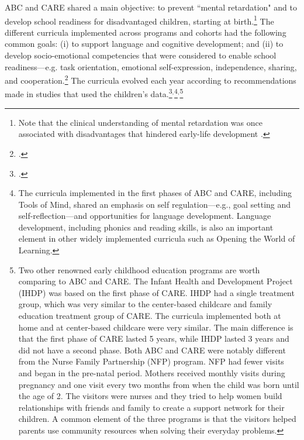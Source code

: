 

\noindent ABC and CARE shared a main objective: to prevent ``mental retardation" and to develop school readiness for disadvantaged children, starting at birth.\footnote{Note that the clinical understanding of mental retardation was once associated with disadvantages that hindered early-life development \citep{Mental-Retardation_America_2004_BOOK_NYU}.} The different curricula implemented across programs and cohorts had the following common goals: (i) to support language and cognitive development; and (ii) to develop socio-emotional competencies that were considered to enable school readiness---e.g. task orientation, emotional self-expression, independence, sharing, and cooperation.\footnote{\citet{Sparling_1974_Synth_Edu_Infant_SPEECH,Ramey_Collier_etal_1976_CarolinaAbecedarianProject,Ramey-etal_2012-ABC}.} The curricula evolved each year according to recommendations made in studies that used the children's data.\footnote{\citet{Ramey-etal_1975_AJoMD,Finkelstein_1982_Day_Care_YC,Haskins_1985_CD}.}$^{,}$\footnote{The curricula implemented in the first phases of ABC and CARE, including Tools of Mind, shared an emphasis on self regulation---e.g., goal setting and self-reflection---and opportunities for language development. Language development, including phonics and reading skills, is also an important element in other widely implemented curricula such as Opening the World of Learning.}$^{,}$\footnote{Two other renowned early childhood education programs are worth comparing to ABC and CARE. The Infant Health and Development Project (IHDP) was based on the first phase of CARE. IHDP had a single treatment group, which was very similar to the center-based childcare and family education treatment group of CARE. The curricula implemented both at home and at center-based childcare were very similar. The main difference is that the first phase of CARE lasted 5 years, while IHDP lasted 3 years and did not have a second phase. Both ABC and CARE were notably different from the Nurse Family Partnership (NFP) program. NFP had fewer visits and began in the pre-natal period. Mothers received monthly visits during pregnancy and one visit every two months from when the child was born until the age of 2. The visitors were nurses and they tried to help women build relationships with friends and family to create a support network for their children. A common element of the three programs is that the visitors helped parents use community resources when solving their everyday problems.}\\

